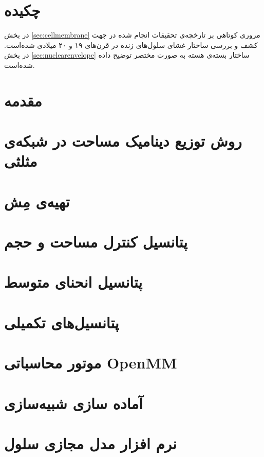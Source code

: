 \setRL
\clearpage
\def \MemMethod {\Mempath /MembraneMethod}

\section{
چکیده
}
در بخش
\ref{sec:cellmembrane}
مروری کوتاهی بر تارخچه‌ی تحقیقات انجام شده در جهت کشف و بررسی ساختار غشای سلول‌های زنده در قرن‌های ۱۹ و ۲۰ میلادی شده‌است. در بخش
\ref{sec:nuclearenvelope}
ساختار بسته‌ی هسته به صورت مختصر توضیح داده شده‌است.

\section{
مقدمه
}



\section{
روش توزیع دینامیک مساحت در شبکه‌ی مثلثی
}


\section{
تهیه‌ی مِش
}


\section{
پتانسیل کنترل مساحت و حجم
}


\section{
پتانسیل انحنای متوسط
}



\section{
پتانسیل‌های تکمیلی
\label{sec:auxPotentials}
}


\section{
موتور محاسباتی
OpenMM
}

\section{
آماده سازی شبیه‌سازی
}

\section{
نرم افزار مدل مجازی سلول
}




